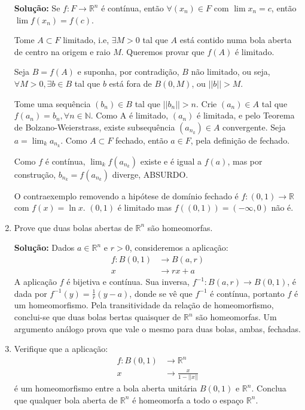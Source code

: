 \documentclass[12pt]{article}
\newcommand{\R}{\mathbb{R}}
\newcommand{\N}{\mathbb{N}}
\newcommand{\rn}{\mathbb{R}^n}
\newcommand{\dps}{\displaystyle}
\begin{document}
\begin{enumerate}
\textbf{Solução:} Se $f:F\to\rn$ é contínua, então $\forall (x_n)\in F$ com $\lim x_n=c$, então $\lim f(x_n)=f(c)$.

Tome $A\subset F$ limitado, i.e, $\exists M>0$ tal que $A$ está contido numa bola aberta de centro na origem e raio $M$. Queremos provar que $f(A)$ é limitado.

Seja $B=f(A)$ e suponha, por contradição, $B$ não limitado, ou seja, $\forall M>0,\exists b\in B$ tal que $b$ está fora de $B(0,M)$, ou $||b||>M$.

Tome uma sequência $(b_n)\in B$ tal que $||b_n||>n$. Crie $(a_n)\in A$ tal que $f(a_n)=b_n,\forall n\in\N$. Como A é limitado, $(a_n)$ é limitada, e pelo Teorema de Bolzano-Weierstrass, existe subsequência $(a_{n_k})\in A$ convergente. Seja $a=\dps\lim_k a_{n_k}$. Como $A\subset F$ fechado, então $a\in F$, pela definição de fechado.

Como $f$ é contínua, $\dps\lim_k f(a_{n_k})$ existe e é igual a $f(a)$, mas por construção, $b_{n_k}=f(a_{n_k})$ diverge, ABSURDO.

O contraexemplo removendo a hipótese de domínio fechado é $f:(0,1)\to\R$ com $f(x)=\ln x$. $(0,1)$ é limitado mas $f((0,1))=(-\infty,0)$ não é.
\item Prove que duas bolas abertas de $\mathbb{R}^n$ são homeomorfas.

\textbf{Solução:} Dados $a \in \mathbb{R}^n$ e $r > 0$, consideremos a aplicação:
\begin{align*}
    f : B(0,1) & \rightarrow B(a, r) \\
    x & \rightarrow rx + a
\end{align*}
A aplicação $f$ é bijetiva e contínua. Sua inversa, $f^{-1}: B(a,r) \rightarrow B(0,1)$, é dada por $f^{-1}(y) = \frac{1}{r}(y-a)$, donde se vê que $f^{-1}$ é contínua, portanto $f$ é um homeomorfismo. Pela transitividade da relação de homeomorfismo, conclui-se que duas bolas bertas quaisquer de $\mathbb{R}^n$ são homeomorfas. Um argumento análogo prova que vale o mesmo para duas bolas, ambas, fechadas.

\item Verifique que a aplicação: 
\begin{align*}
    f : B(0,1) & \rightarrow \mathbb{R}^n \\
    x & \rightarrow \frac{x}{1 - ||x||} 
\end{align*}
é um homeomorfismo entre a bola aberta unitária $B(0,1)$ e $\mathbb{R}^n$. Conclua que qualquer bola aberta de $\mathbb{R}^n$ é homeomorfa a todo o espaço $\mathbb{R}^n$.


\end{enumerate}
\end{document}
